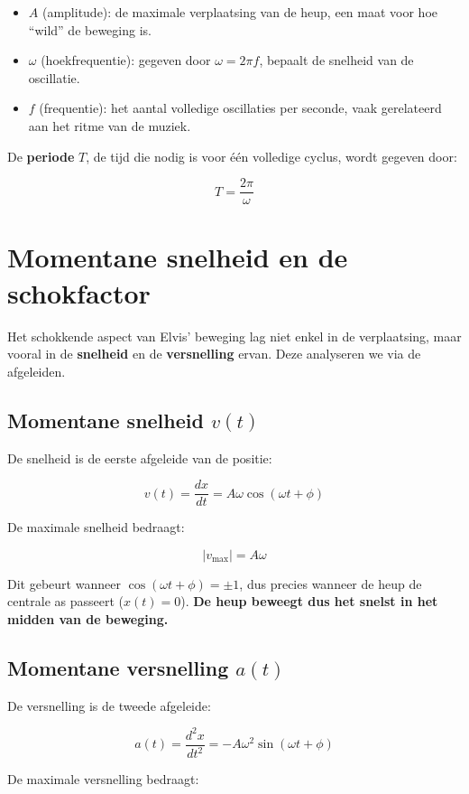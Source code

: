 \documentclass{book}
\begin{document}
	\begin{itemize}
		\item $A$ (amplitude): de maximale verplaatsing van de heup, een maat voor hoe ``wild'' de beweging is.
		\item $\omega$ (hoekfrequentie): gegeven door \(\omega = 2\pi f\), bepaalt de snelheid van de oscillatie.
		\item $f$ (frequentie): het aantal volledige oscillaties per seconde, vaak gerelateerd aan het ritme van de muziek.
	\end{itemize}
	
	De \textbf{periode} $T$, de tijd die nodig is voor \'e\'en volledige cyclus, wordt gegeven door:
	
	\[
	T = \frac{2\pi}{\omega}
	\]
	
	\section{Momentane snelheid en de schokfactor}
	
	Het schokkende aspect van Elvis' beweging lag niet enkel in de verplaatsing, 
	maar vooral in de \textbf{snelheid} en de \textbf{versnelling} ervan. 
	Deze analyseren we via de afgeleiden.
	
	\subsection{Momentane snelheid $v(t)$}
	
	De snelheid is de eerste afgeleide van de positie:
	
	\[
	v(t) = \frac{dx}{dt} 
	= A \omega \cos(\omega t + \phi)
	\]
	
	\noindent De maximale snelheid bedraagt:
	
	\[
	|v_{\text{max}}| = A \omega
	\]
	
	Dit gebeurt wanneer $\cos(\omega t + \phi) = \pm 1$, 
	dus precies wanneer de heup de centrale as passeert ($x(t) = 0$).  
	\textbf{De heup beweegt dus het snelst in het midden van de beweging.}
	
	\subsection{Momentane versnelling $a(t)$}
	
	De versnelling is de tweede afgeleide:
	
	\[
	a(t) = \frac{d^2x}{dt^2} 
	= -A \omega^2 \sin(\omega t + \phi)
	\]
	
	\noindent De maximale versnelling bedraagt:
	
\end{document}
